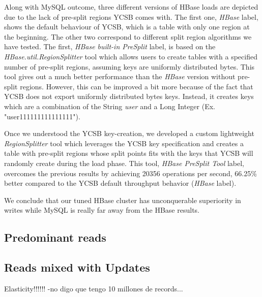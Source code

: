 Along with MySQL outcome, three different versions of HBase loads are depicted due to the lack of pre-split regions YCSB comes with. The first one, \textit{HBase} label, shows the default behaviour of YCSB, which is a table with only one region at the beginning. The other two correspond to different split region algorithms we have tested. The first, \textit{HBase built-in PreSplit} label, is based on the \textit{HBase.util.RegionSplitter} tool which allows users to create tables with a specified number of pre-split regions, assuming keys are uniformly distributed bytes. This tool gives out a much better performance than the \textit{HBase} version without pre-split regions. However, this can be improved a bit more because of the fact that YCSB does not export uniformly distributed bytes keys. Instead, it creates keys which are a combination of the String \textit{user} and a Long Integer (Ex. "user111111111111111").
\par
Once we understood the YCSB key-creation, we developed a custom lightweight \textit{RegionSplitter} tool which leverages the YCSB key specification and creates a table with pre-split regions whose split points fits with the keys that YCSB will randomly create during the load phase. This tool, \textit{HBase PreSplit Tool} label, overcomes the previous results by achieving 20356 operations per second,  66.25\% better compared to the YCSB default throughput behavior (\textit{HBase} label). 
\par
We conclude that our tuned HBase cluster has unconquerable superiority in writes while MySQL is really far away from the HBase results.


\subsection{Predominant reads}



\subsection{Reads mixed with Updates}


Elasticity!!!!!!
-no digo que tengo 10 millones de records...





































